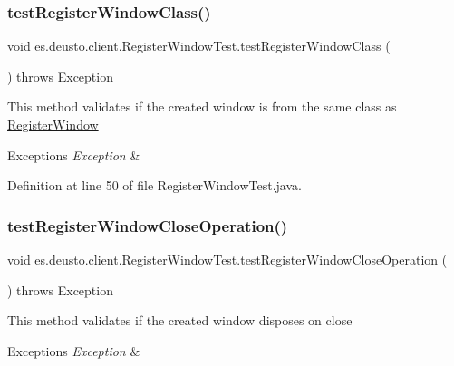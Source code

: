 \subsubsection{\texorpdfstring{test\+Register\+Window\+Class()}{testRegisterWindowClass()}}
{\footnotesize\ttfamily void es.\+deusto.\+client.\+Register\+Window\+Test.\+test\+Register\+Window\+Class (\begin{DoxyParamCaption}{ }\end{DoxyParamCaption}) throws Exception}

This method validates if the created window is from the same class as \hyperlink{classes_1_1deusto_1_1client_1_1_register_window}{Register\+Window}


\begin{DoxyExceptions}{Exceptions}
{\em Exception} & \\
\hline
\end{DoxyExceptions}


Definition at line 50 of file Register\+Window\+Test.\+java.

\mbox{\label{classes_1_1deusto_1_1client_1_1_register_window_test_acd9f26a04a5bc49f4366864e55df939d}} 
\subsubsection{\texorpdfstring{test\+Register\+Window\+Close\+Operation()}{testRegisterWindowCloseOperation()}}
{\footnotesize\ttfamily void es.\+deusto.\+client.\+Register\+Window\+Test.\+test\+Register\+Window\+Close\+Operation (\begin{DoxyParamCaption}{ }\end{DoxyParamCaption}) throws Exception}

This method validates if the created window disposes on close


\begin{DoxyExceptions}{Exceptions}
{\em Exception} & \\
\hline
\end{DoxyExceptions}


